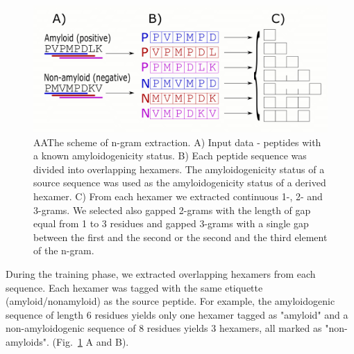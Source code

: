 \documentclass{bioinfo}
\begin{document}
\begin{methods}
\begin{figure}[!tpb]
\includegraphics[width=\columnwidth]{figures/ngram_scheme.png}
  \caption{AAThe scheme of n-gram extraction. A) Input data - peptides with a 
known amyloidogenicity status. B) Each peptide sequence was divided into 
overlapping hexamers. The amyloidogenicity status of a source sequence was used 
as the amyloidogenicity status of a derived hexamer. C) From each hexamer we 
extracted continuous 1-, 2- and 3-grams. We selected also gapped 2-grams with 
the length of gap equal from 1 to 3 residues and gapped 3-grams with a single 
gap between the first and the second or the second and the third element of the 
n-gram.}
\label{fig:ngram_scheme}
\end{figure}

  During the training phase, we extracted overlapping hexamers from each sequence. 
%
%
%
Each hexamer was tagged with the same etiquette (amyloid/nonamyloid) as the 
source peptide. For example, the amyloidogenic sequence of length 6 residues 
yields only one 
%
%
%
%
%
%
%
%
%
hexamer tagged as "amyloid" and a non-amyloidogenic sequence of 8 residues yields 
3 hexamers, all marked as "non-amyloids". (Fig.~\ref{fig:ngram_scheme} A and B). 


\end{methods}
\end{document}
